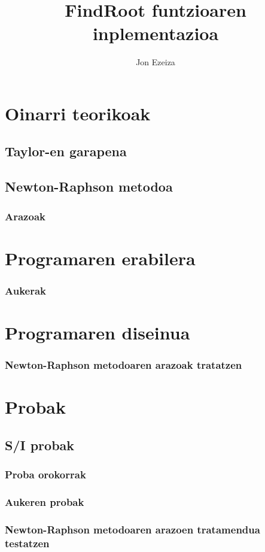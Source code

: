 \documentclass[10pt,a4paper,basque]{article}
\author{Jon Ezeiza}
\title{FindRoot funtzioaren inplementazioa}
\begin{document}
\maketitle

\begin{abstract}

\end{abstract}

\section{Oinarri teorikoak}

\subsection{Taylor-en garapena}

\subsection{Newton-Raphson metodoa}

\subsubsection{Arazoak}

\section{Programaren erabilera}

\subsubsection{Aukerak}

\section{Programaren diseinua}

\subsubsection{Newton-Raphson metodoaren arazoak tratatzen}

\section{Probak}

\subsection{S/I probak}

\subsubsection{Proba orokorrak}

\subsubsection{Aukeren probak}

\subsubsection{Newton-Raphson metodoaren arazoen tratamendua testatzen}
\end{document}
